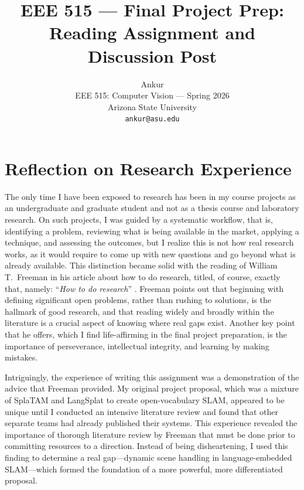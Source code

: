 \documentclass[10pt,twocolumn,letterpaper]{article}
\begin{document}
\title{EEE 515 --- Final Project Prep:\\Reading Assignment and Discussion Post}

\author{Ankur\\
EEE 515: Computer Vision --- Spring 2026\\
Arizona State University\\
{\tt\small ankur@asu.edu}
}

\maketitle

\section{Reflection on Research Experience}

The only time I have been exposed to research has been in my course projects as an undergraduate and graduate student and not as a thesis course and laboratory research. On such projects, I was guided by a systematic workflow, that is, identifying a problem, reviewing what is being available in the market, applying a technique, and assessing the outcomes, but I realize this is not how real research works, as it would require to come up with new questions and go beyond what is already available. This distinction became solid with the reading of William T.\ Freeman in his article about how to do research, titled, of course, exactly that, namely: ``\textit{How to do research}'' \cite{freeman}. Freeman points out that beginning with defining significant open problems, rather than rushing to solutions, is the hallmark of good research, and that reading widely and broadly within the literature is a crucial aspect of knowing where real gaps exist. Another key point that he offers, which I find life-affirming in the final project preparation, is the importance of perseverance, intellectual integrity, and learning by making mistakes.

Intriguingly, the experience of writing this assignment was a demonstration of the advice that Freeman provided. My original project proposal, which was a mixture of SplaTAM and LangSplat to create open-vocabulary SLAM, appeared to be unique until I conducted an intensive literature review and found that other separate teams had already published their systems. This experience revealed the importance of thorough literature review by Freeman that must be done prior to committing resources to a direction. Instead of being disheartening, I used this finding to determine a real gap---dynamic scene handling in language-embedded SLAM---which formed the foundation of a more powerful, more differentiated proposal.
\end{document}
